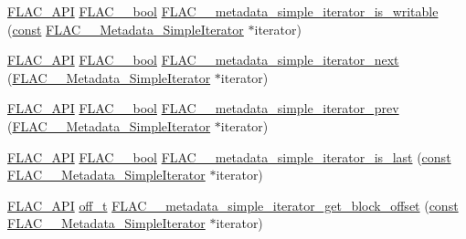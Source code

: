 \begin{DoxyCompactItemize}
\item 
\hyperlink{group__flac__export_ga56ca07df8a23310707732b1c0007d6f5}{F\+L\+A\+C\+\_\+\+A\+PI} \hyperlink{ordinals_8h_a95103469f1cbd78b8cf250194985b34e}{F\+L\+A\+C\+\_\+\+\_\+bool} \hyperlink{group__flac__metadata__level1_gadc654c1361b53737bab20efa3e75a0fc}{F\+L\+A\+C\+\_\+\+\_\+metadata\+\_\+simple\+\_\+iterator\+\_\+is\+\_\+writable} (\hyperlink{getopt1_8c_a2c212835823e3c54a8ab6d95c652660e}{const} \hyperlink{struct_f_l_a_c_____metadata___simple_iterator}{F\+L\+A\+C\+\_\+\+\_\+\+Metadata\+\_\+\+Simple\+Iterator} $\ast$iterator)
\item 
\hyperlink{group__flac__export_ga56ca07df8a23310707732b1c0007d6f5}{F\+L\+A\+C\+\_\+\+A\+PI} \hyperlink{ordinals_8h_a95103469f1cbd78b8cf250194985b34e}{F\+L\+A\+C\+\_\+\+\_\+bool} \hyperlink{group__flac__metadata__level1_gacac860d14fc0ff37cc2c034d3f972320}{F\+L\+A\+C\+\_\+\+\_\+metadata\+\_\+simple\+\_\+iterator\+\_\+next} (\hyperlink{struct_f_l_a_c_____metadata___simple_iterator}{F\+L\+A\+C\+\_\+\+\_\+\+Metadata\+\_\+\+Simple\+Iterator} $\ast$iterator)
\item 
\hyperlink{group__flac__export_ga56ca07df8a23310707732b1c0007d6f5}{F\+L\+A\+C\+\_\+\+A\+PI} \hyperlink{ordinals_8h_a95103469f1cbd78b8cf250194985b34e}{F\+L\+A\+C\+\_\+\+\_\+bool} \hyperlink{group__flac__metadata__level1_ga49f495dec0f44116d66e1b79356a1160}{F\+L\+A\+C\+\_\+\+\_\+metadata\+\_\+simple\+\_\+iterator\+\_\+prev} (\hyperlink{struct_f_l_a_c_____metadata___simple_iterator}{F\+L\+A\+C\+\_\+\+\_\+\+Metadata\+\_\+\+Simple\+Iterator} $\ast$iterator)
\item 
\hyperlink{group__flac__export_ga56ca07df8a23310707732b1c0007d6f5}{F\+L\+A\+C\+\_\+\+A\+PI} \hyperlink{ordinals_8h_a95103469f1cbd78b8cf250194985b34e}{F\+L\+A\+C\+\_\+\+\_\+bool} \hyperlink{group__flac__metadata__level1_ga4dd81539fb698163209d05af13a2ec3c}{F\+L\+A\+C\+\_\+\+\_\+metadata\+\_\+simple\+\_\+iterator\+\_\+is\+\_\+last} (\hyperlink{getopt1_8c_a2c212835823e3c54a8ab6d95c652660e}{const} \hyperlink{struct_f_l_a_c_____metadata___simple_iterator}{F\+L\+A\+C\+\_\+\+\_\+\+Metadata\+\_\+\+Simple\+Iterator} $\ast$iterator)
\item 
\hyperlink{group__flac__export_ga56ca07df8a23310707732b1c0007d6f5}{F\+L\+A\+C\+\_\+\+A\+PI} \hyperlink{macconfig_8h_ae498af04567b740d66e09d36613c2cd8}{off\+\_\+t} \hyperlink{group__flac__metadata__level1_ga46e158a3f70c0e39db9c68a9ff9a2621}{F\+L\+A\+C\+\_\+\+\_\+metadata\+\_\+simple\+\_\+iterator\+\_\+get\+\_\+block\+\_\+offset} (\hyperlink{getopt1_8c_a2c212835823e3c54a8ab6d95c652660e}{const} \hyperlink{struct_f_l_a_c_____metadata___simple_iterator}{F\+L\+A\+C\+\_\+\+\_\+\+Metadata\+\_\+\+Simple\+Iterator} $\ast$iterator)

\end{DoxyCompactItemize}
